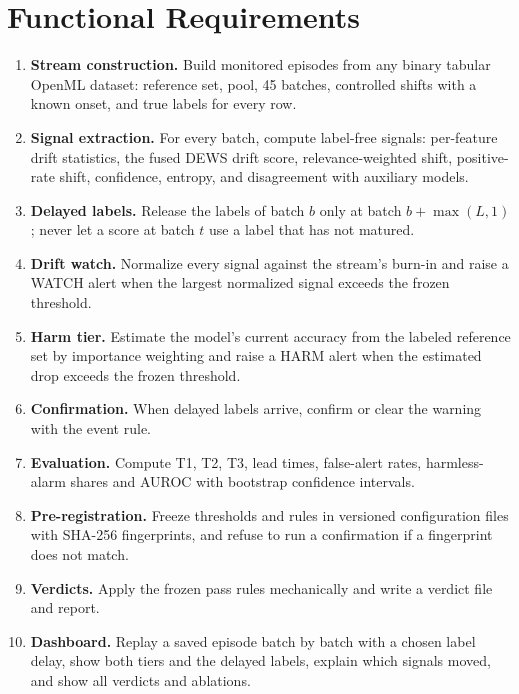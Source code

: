 \section{Functional Requirements}
\begin{enumerate}[label=FR\arabic*.]
\item \textbf{Stream construction.} Build monitored episodes from any binary tabular OpenML dataset: reference set, pool, 45 batches, controlled shifts with a known onset, and true labels for every row.
\item \textbf{Signal extraction.} For every batch, compute label-free signals: per-feature drift statistics, the fused DEWS drift score, relevance-weighted shift, positive-rate shift, confidence, entropy, and disagreement with auxiliary models.
\item \textbf{Delayed labels.} Release the labels of batch $b$ only at batch $b+\max(L,1)$; never let a score at batch $t$ use a label that has not matured.
\item \textbf{Drift watch.} Normalize every signal against the stream's burn-in and raise a WATCH alert when the largest normalized signal exceeds the frozen threshold.
\item \textbf{Harm tier.} Estimate the model's current accuracy from the labeled reference set by importance weighting and raise a HARM alert when the estimated drop exceeds the frozen threshold.
\item \textbf{Confirmation.} When delayed labels arrive, confirm or clear the warning with the event rule.
\item \textbf{Evaluation.} Compute T1, T2, T3, lead times, false-alert rates, harmless-alarm shares and AUROC with bootstrap confidence intervals.
\item \textbf{Pre-registration.} Freeze thresholds and rules in versioned configuration files with SHA-256 fingerprints, and refuse to run a confirmation if a fingerprint does not match.
\item \textbf{Verdicts.} Apply the frozen pass rules mechanically and write a verdict file and report.
\item \textbf{Dashboard.} Replay a saved episode batch by batch with a chosen label delay, show both tiers and the delayed labels, explain which signals moved, and show all verdicts and ablations.
\end{enumerate}

